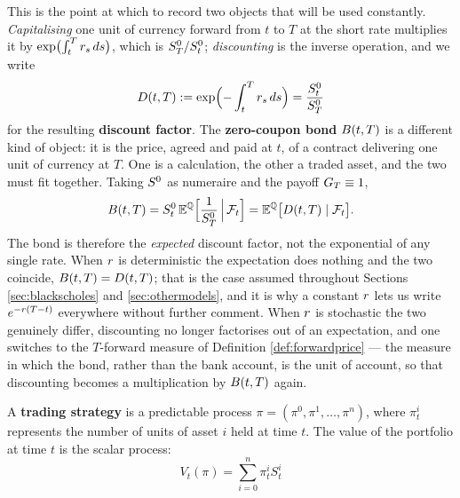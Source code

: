 This is the point at which to record two objects that will be used constantly. \emph{Capitalising} one unit of currency forward from $t$ to $T$ at the short rate multiplies it
by $\exp\bigl(\int_t^T r_s\,ds\bigr)$, which is $S^{0}_T/S^{0}_t$; \emph{discounting} is the inverse
operation, and we write
\begin{equation}\label{eq:discountfactor}
D(t,T) := \exp\Bigl(-\int_t^T r_s\,ds\Bigr) = \frac{S^{0}_t}{S^{0}_T}
\end{equation}
for the resulting \textbf{discount factor}. The \textbf{zero-coupon bond} $B(t,T)$ is a
different kind of object: it is the price, agreed and paid at $t$, of a contract delivering one unit
of currency at $T$. One is a calculation, the other a traded asset, and the two must fit together.
Taking $S^{0}$ as
numeraire and the payoff $G_T \equiv 1$,
\begin{equation}\label{eq:bonddiscount}
B(t,T) = S^{0}_t\,\mathbb{E}^{\mathbb{Q}}\Bigl[\frac{1}{S^{0}_T}\,\Big|\,\mathcal{F}_t\Bigr] = \mathbb{E}^{\mathbb{Q}}\bigl[D(t,T)\mid\mathcal{F}_t\bigr].
\end{equation}
The bond is therefore the \emph{expected} discount factor, not the exponential of any single rate.
When $r$ is deterministic the expectation does nothing and the two coincide, $B(t,T) = D(t,T)$;
that is the case assumed throughout Sections \ref{sec:blackscholes} and \ref{sec:othermodels}, and it
is why a constant $r$ lets us write $e^{-r(T-t)}$ everywhere without further comment. When $r$ is
stochastic the two genuinely differ, discounting no longer factorises out of an expectation, and one
switches to the $T$-forward measure of Definition \ref{def:forwardprice} --- the measure in which the
bond, rather than the bank account, is the unit of account, so that discounting becomes a
multiplication by $B(t,T)$ again. 



A \textbf{trading strategy} is a predictable process $\pi = (\pi^0, \pi^1, \dots, \pi^n)$, where $\pi^i_t$ represents the number of units of asset $i$ held at time $t$. The value of the portfolio at time $t$ is the scalar process:
\begin{equation}
    V_t(\pi) = \sum_{i=0}^n \pi^i_t S^i_t
\end{equation}

